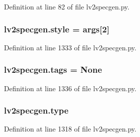 Definition at line 82 of file lv2specgen.\+py.

\subsubsection[{\texorpdfstring{style}{style}}]{\setlength{\rightskip}{0pt plus 5cm}lv2specgen.\+style = {\bf args}\mbox{[}2\mbox{]}}\hypertarget{namespacelv2specgen_a5a176513c7f83ab7518d32ef1dba5b81}{}\label{namespacelv2specgen_a5a176513c7f83ab7518d32ef1dba5b81}


Definition at line 1333 of file lv2specgen.\+py.

\subsubsection[{\texorpdfstring{tags}{tags}}]{\setlength{\rightskip}{0pt plus 5cm}lv2specgen.\+tags = None}\hypertarget{namespacelv2specgen_af2d57abb8725f566629ed73846808438}{}\label{namespacelv2specgen_af2d57abb8725f566629ed73846808438}


Definition at line 1336 of file lv2specgen.\+py.

\subsubsection[{\texorpdfstring{type}{type}}]{\setlength{\rightskip}{0pt plus 5cm}lv2specgen.\+type}\hypertarget{namespacelv2specgen_a581a048e7ac439435d67c2f1ce03d637}{}\label{namespacelv2specgen_a581a048e7ac439435d67c2f1ce03d637}


Definition at line 1318 of file lv2specgen.\+py.


